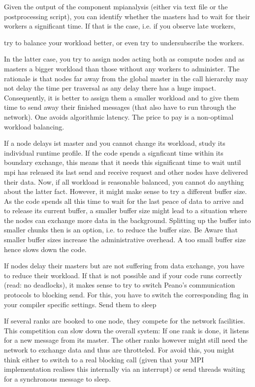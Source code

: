Given the output of the component mpianalysis (either via text file or the postprocessing script), you can identify whether the masters had to wait for their workers a significant time. If that is the case, i.e. if you observe late workers,

    try to balance your workload better, or
    even try to undersubscribe the workers.

In the latter case, you try to assign nodes acting both as compute nodes and as masters a bigger workload than those without any workers to administer. The rationale is that nodes far away from the global master in the call hierarchy may not delay the time per traversal as any delay there has a huge impact. Consequently, it is better to assign them a smaller workload and to give them time to send away their finished messages (that also have to run through the network). One avoids algorithmic latency. The price to pay is a non-optimal workload balancing.

If a node delays ist master and you cannot change its workload, study its individual runtime profile. If the code spends a signficant time within its boundary exchange, this means that it needs this significant time to wait until mpi has released its last send and receive request and other nodes have delivered their data. Now, if all workload is reasonable balanced, you cannot do anything about the latter fact. However, it might make sense to try a different buffer size. As the code spends all this time to wait for the last peace of data to arrive and to release its current buffer, a smaller buffer size might lead to a situation where the nodes can exchange more data in the background. Splitting up the buffer into smaller chunks then is an option, i.e. to reduce the buffer size. Be Aware that smaller buffer sizes increase the administrative overhead. A too small buffer size hence slows down the code.

If nodes delay their masters but are not suffering from data exchange, you have to reduce their workload. If that is not possible and if your code runs correctly (read: no deadlocks), it makes sense to try to switch Peano's communication protocols to blocking send. For this, you have to switch the corresponding flag in your compiler specific settings.
Send them to sleep

If several ranks are booked to one node, they compete for the network facilities. This competition can slow down the overall system: If one rank is done, it listens for a new message from its master. The other ranks however might still need the network to exchange data and thus are throtteled. For avoid this, you might think either to switch to a real blocking call (given that your MPI implementation realises this internally via an interrupt) or send threads waiting for a synchronous message to sleep.

